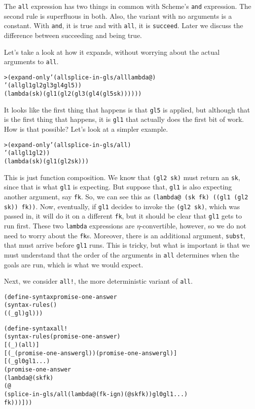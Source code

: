 The \texttt{all} expression has two things in common with Scheme's
\texttt{and} expression.  The second rule is superfluous in both.  Also,
the variant with no arguments is a constant.  With \texttt{and}, it is true
and with \texttt{all}, it is \texttt{succeed}.  Later we discuss the
difference between succeeding and being true.

Let's take a look at how it expands, without worrying about
the actual arguments to \texttt{all}.

\begin{alltt}
> (expand-only '(all splice-in-gls/all lambda@)
    '(all gl1 gl2 gl3 gl4 gl5))
(lambda (sk) (gl1 (gl2 (gl3 (gl4 (gl5 sk))))))
\end{alltt}

\noindent
It looks like the first thing that happens is that \texttt{gl5} is
applied, but although that is the first thing that happens, it is
\texttt{gl1} that actually does the first bit of work.  How is that
possible?  Let's look at a simpler example.

\begin{alltt}
> (expand-only '(all splice-in-gls/all)
    '(all gl1 gl2))
(lambda (sk) (gl1 (gl2 sk)))
\end{alltt}

\noindent
This is just function composition.  We know that \texttt{(gl2 sk)}
must return an \texttt{sk}, since that is what \texttt{gl1} is
expecting.  But suppose that, \texttt{gl1} is also expecting another
argument, say \texttt{fk}. So, we can see this as \texttt{(lambda@ (sk
fk) ((gl1 (gl2 sk)) fk))}.  Now, eventually, if \texttt{gl1}
decides to invoke the \texttt{(gl2 sk)}, which was passed in, it will
do it on a different \texttt{fk}, but it should be clear that
\texttt{gl1} gets to run first.  These two \texttt{lambda}
expressions are $\eta$-convertible, however, so we do not need to
worry about the \texttt{fk}s.  Moreover, there is an additional
argument, \texttt{subst}, that must arrive before \texttt{gl1} runs.
This is tricky, but what is important is that we must understand that
the order of the arguments in \texttt{all} determines when the
goals are run, which is what we would expect.

Next, we consider \texttt{all!}, the more deterministic variant of
\texttt{all}.

\begin{alltt}
(define-syntax promise-one-answer
  (syntax-rules ()
    ((_ gl) gl)))

(define-syntax all!
  (syntax-rules (promise-one-answer)
    [(_) (all)]
    [(_ (promise-one-answer gl)) (promise-one-answer gl)]
    [(_ gl0 gl1 ...)
     (promise-one-answer
       (lambda@ (sk fk)
	 (@
	   (splice-in-gls/all (lambda@ (fk-ign) (@ sk fk)) gl0 gl1 ...)
	   fk)))]))
\end{alltt}

